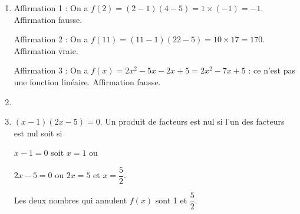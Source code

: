 
\medskip

%
%

\begin{enumerate}
\item %

Affirmation 1 : On a $f(2) = (2 - 1)(4 - 5) = 1 \times (- 1) = - 1$. Affirmation fausse. 

Affirmation 2 : %
On a $f(11) = (11 - 1)(22 - 5) = 10 \times 17 = 170$. Affirmation vraie.

Affirmation 3 : %
On a $f(x) = 2x^2 - 5x - 2x + 5 = 2x^2 - 7x + 5$ : ce n'est pas une fonction linéaire. Affirmation fausse. 
\item  %
\item  %
$(x - 1)(2x - 5) = 0$. Un produit de facteurs est nul si l'un des facteurs est nul soit si 

$x - 1 = 0$ soit $x = 1$ ou

$2x - 5 = 0$ ou $2x  = 5$ et  $x = \dfrac{5}{2}$.

Les deux nombres qui annulent $f(x)$ sont 1 et $\dfrac{5}{2}$. 
\end{enumerate}

\vspace{0.5cm}

